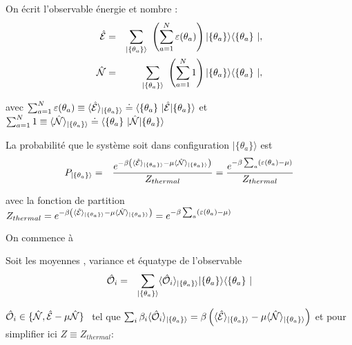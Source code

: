On écrit l'observable énergie et nombre :
	\begin{eqnarray}
		\operator{\mathcal{E}} & = & \sum_{ \vert \{ \theta_a\} \rangle }  \left ( \sum_{a = 1}^N  \varepsilon ( \theta_a ) \right )   \vert \{ \theta_a\}\rangle	\langle \{ \theta_a \} \vert, \\
		\operator{\mathcal{N}} & = & \sum_{\vert \{\theta_a\} \rangle }   \left ( \sum_{a = 1}^N  1 \right )  \vert \{ \theta_a\}\rangle	\langle \{ \theta_a \} \vert,
	\end{eqnarray}
	
	avec $  \sum_{a = 1}^N  \varepsilon ( \theta_a ) \equiv \langle \operator{\mathcal{E}} \rangle_{\vert \{\theta_a \} \rangle}  \doteq  \langle \{ \theta_a \} \vert  \operator{ \mathcal{E}}  \vert \{ \theta_a\}\rangle $ et $\sum_{a = 1}^N 1 \equiv \langle \operator{\mathcal{N}} \rangle_{\vert \{\theta_a \} \rangle}  \doteq  \langle \{ \theta_a \} \vert  \operator{\mathcal{N}}  \vert \{ \theta_a\}\rangle $

	
	La probabilité que le système soit dans configuration $\vert \{ \theta_a \}\rangle $  est 
	\begin{eqnarray}
		P_{\vert \{\theta_a \} \rangle} & = & \frac{e^{- \beta \left ( \langle \hat{\mathbf{\mathcal{E}}} \rangle_{\vert \{\theta_a \} \rangle}   - \mu \langle \hat{\mathbf{\mathcal{N}}} \rangle_{\vert \{\theta_a \} \rangle} \right )}}{Z_{thermal}} = \frac{e^{- \beta \sum_a  ( \varepsilon( \theta_a )   - \mu  )}}{Z_{thermal}}	
	\end{eqnarray}
	
	avec la fonction de partition $Z_{thermal} = e^{- \beta \left ( \langle \hat{\mathbf{\mathcal{E}}} \rangle_{\vert \{\theta_a \} \rangle}   - \mu \langle \hat{\mathbf{\mathcal{N}}} \rangle_{\vert \{\theta_a \} \rangle} \right )} =  e^{- \beta \sum_a  ( \varepsilon( \theta_a )   - \mu  )}$
	
	On commence à 
	
	Soit les moyennes , variance et équatype de l'observable 
	\begin{eqnarray}
		\operator{\mathcal{O}}_i & = & \sum_{\vert \{\theta_a \} \rangle} \langle \operator{\mathcal{O}}_i \rangle_{\vert \{\theta_a \} \rangle}  \vert \{ \theta_a\}\rangle	\langle \{ \theta_a \} \vert
	\end{eqnarray}
	
	$\operator{\mathcal{O}}_i \in \{\operator{\mathcal{N}} , \operator{\mathcal{E}} - \mu \operator{\mathcal{N}} \} $  tel que $\sum_i \beta_i \langle \hat{\mathbf{\mathcal{O}}}_i \rangle_{\vert \{\theta_a \} \rangle} = \beta \left ( \langle \hat{\mathbf{\mathcal{E}}} \rangle_{\vert \{\theta_a \} \rangle}   - \mu \langle \hat{\mathbf{\mathcal{N}}} \rangle_{\vert \{\theta_a \} \rangle} \right ) $ et pour simplifier ici $Z \equiv Z_{thermal}$:
	
